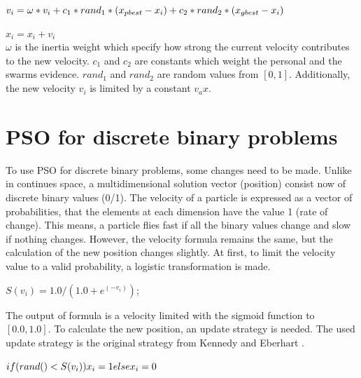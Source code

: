 \documentclass{article}
\begin{document}
\begin{math}
\label{formula-1}
v_i = \omega * v_i + c_1 * rand_1 * (x_{pbest} - x_i) + c_2 * rand_2 * (x_{gbest} - x_i) \\
\end{math}

\begin{math}
\label{formula-2}
x_i = x_i + v_i
\end{math}
\\
$\omega$ is the inertia weight which specify how strong the current velocity contributes to the new velocity. $c_1$ and $c_2$ are constants which weight the personal and the swarms evidence. $rand_1$ and $rand_2$ are random values from $[0,1]$. Additionally, the new velocity $v_i$ is limited by a constant $v_ax$.

\section{PSO for discrete binary problems}
\label{lbl-pso-disc}
To use PSO for discrete binary problems, some changes need to be made. Unlike in continues space, a multidimensional solution vector (position) consist now of discrete binary values (0/1). The velocity of a particle is expressed as a vector of probabilities, that the elements at each dimension have the value 1 (rate of change). This means, a particle flies fast if all the binary values change and slow if nothing changes. However, the velocity formula remains the same, but the calculation of the new position changes slightly. At first, to limit the velocity value to a valid probability, a logistic transformation is made.

\begin{math}
S(v_i) = 1.0 / (1.0 + e^{(-v_i)});
\end{math}

The output of formula is a velocity limited with the sigmoid function to $[0.0, 1.0]$. To calculate the new position, an update strategy is needed. The used update strategy is the original strategy from Kennedy and Eberhart \cite{bib-discrete}.

\begin{math}
if (rand() < S(v_i))\\
	x_i = 1\\
else\\
	x_i = 0
\end{math}
\end{document}
